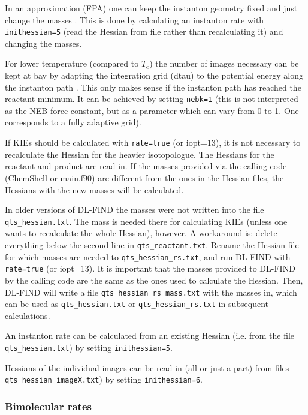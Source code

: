 \documentclass{article}
\begin{document}
\begin{enumerate}
  In an approximation (FPA) one can keep the instanton geometry fixed
  and just change the masses \cite{mei11}. This is done by calculating an instanton
  rate with \texttt{inithessian=5} (read the Hessian from file rather
  than recalculating it) and changing the masses.
\end{enumerate}

For lower temperature (compared to $T_\mathrm{c}$) the number of
images necessary can be kept at bay by adapting the integration grid
(dtau) to the potential energy along the instanton path \cite{rom11b}. This only
makes sense if the instanton path has reached the reactant minimum. It
can be achieved by setting \texttt{nebk=1} (this is not interpreted as
the NEB force constant, but as a parameter which can vary from 0 to
1. One corresponds to a fully adaptive grid).

If KIEs should be calculated with \texttt{rate=true} (or iopt=13), it is
not necessary to recalculate the Hessian for the heavier isotopologue. The
Hessians for the reactant and product are read in. If the masses provided via
the calling code (ChemShell or main.f90) are different from the ones in the
Hessian files, the Hessians with the new masses will be calculated.

In older versions of DL-FIND the masses were not written into the file
\texttt{qts\_hessian.txt}. The mass is needed there for calculating KIEs
(unless one wants to recalculate the whole Hessian), however. A workaround is:
delete everything below the second line in \texttt{qts\_reactant.txt}. Rename
the Hessian file for which masses are needed to \texttt{qts\_hessian\_rs.txt},
and run DL-FIND with \texttt{rate=true} (or iopt=13). It is important that the
masses provided to DL-FIND by the calling code are the same as the ones used
to calculate the Hessian. Then, DL-FIND will write a file
\texttt{qts\_hessian\_rs\_mass.txt} with the masses in, which can be used as
\texttt{qts\_hessian.txt} or \texttt{qts\_hessian\_rs.txt} in subsequent
calculations.

An instanton rate can be calculated from an existing Hessian (i.e. from the
file \texttt{qts\_hessian.txt}) by setting \texttt{inithessian=5}.

Hessians of the individual images can be read in (all or just a part)
from files \texttt{qts\_hessian\_imageX.txt}) by setting \texttt{inithessian=6}.

\subsubsection{Bimolecular rates \label{sec:bimol}}
\end{document}
